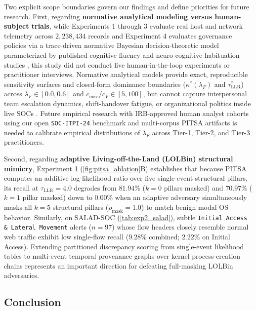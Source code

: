 \documentclass[11pt,a4paper]{article}
\let\oldtexttt\texttt
\renewcommand{\texttt}[1]{\textnormal{\oldtexttt{#1}}}
\begin{document}
Two explicit scope boundaries govern our findings and define priorities for future research. First, regarding \textbf{normative analytical modeling versus human-subject trials}, while Experiments 1 through 3 evaluate real host and network telemetry across $2,238,434$ records and Experiment 4 evaluates governance policies via a trace-driven normative Bayesian decision-theoretic model parameterized by published cognitive fluency and neuro-cognitive habituation studies \citep{alter2009uniting, anderson2016warning, vance2018fog, vasconcelos2023explanations, bag2025enhancing}, this study did not conduct live human-in-the-loop experiments or practitioner interviews. Normative analytical models provide exact, reproducible sensitivity surfaces and closed-form dominance boundaries ($\kappa^*(\lambda_F)$ and $\tau^*_{\text{LLR}}$) across $\lambda_F \in [0.0, 0.6]$ and $c_{\text{miss}}/c_V \in [5, 100]$, but cannot capture interpersonal team escalation dynamics, shift-handover fatigue, or organizational politics inside live SOCs \citep{revilla2023human, bartal2026alert}. Future empirical research with IRB-approved human analyst cohorts using our open \texttt{SOC-ITPI-24} benchmark and multi-corpus PITSA artifacts is needed to calibrate empirical distributions of $\lambda_F$ across Tier-1, Tier-2, and Tier-3 practitioners.

Second, regarding \textbf{adaptive Living-off-the-Land (LOLBin) structural mimicry}, Experiment 1 (\cref{fig:pitsa_ablation}B) establishes that because PITSA computes an additive log-likelihood ratio over five single-event structural pillars, its recall at $\tau_{\text{LLR}} = 4.0$ degrades from $81.94\%$ ($k=0$ pillars masked) and $70.97\%$ ($k=1$ pillar masked) down to $0.00\%$ when an adaptive adversary simultaneously masks all $k=5$ structural pillars ($\rho_{\text{mask}} = 1.0$) to match benign modal OS behavior. Similarly, on SALAD-SOC (\cref{tab:exp2_salad}), subtle \texttt{Initial Access \& Lateral Movement} alerts ($n=97$) whose flow headers closely resemble normal web traffic exhibit low single-flow recall ($9.28\%$ combined; $2.22\%$ on Initial Access). Extending partitioned discrepancy scoring from single-event likelihood tables to multi-event temporal provenance graphs over kernel process-creation chains represents an important direction for defeating full-masking LOLBin adversaries.

\subsection{Conclusion}
\label{subsec:conclusion}
\end{document}
